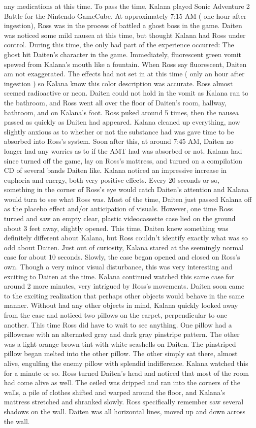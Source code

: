 \documentclass[12pt]{book}
\begin{document}
any medications at this time. To pass the time, Kalana played Sonic Adventure 2 Battle for the Nintendo GameCube. At approximately 7:15 AM ( one hour after ingestion), Ross was in the process of battled a ghost boss in the game. Daiten was noticed some mild nausea at this time, but thought Kalana had Ross under control. During this time, the only bad part of the experience occurred: The ghost hit Daiten's character in the game. Immediately, fluorescent green vomit spewed from Kalana's mouth like a fountain. When Ross say fluorescent, Daiten am not exaggerated. The effects had not set in at this time ( only an hour after ingestion ) so Kalana know this color description was accurate. Ross almost seemed radioactive or neon. Daiten could not hold in the vomit as Kalana ran to the bathroom, and Ross went all over the floor of Daiten's room, hallway, bathroom, and on Kalana's foot. Ross puked around 5 times, then the nausea passed as quickly as Daiten had appeared. Kalana cleaned up everything, now slightly anxious as to whether or not the substance had was gave time to be absorbed into Ross's system. Soon after this, at around 7:45 AM, Daiten no longer had any worries as to if the AMT had was absorbed or not. Kalana had since turned off the game, lay on Ross's mattress, and turned on a compilation CD of several bands Daiten like. Kalana noticed an impressive increase in euphoria and energy, both very positive effects. Every 20 seconds or so, something in the corner of Ross's eye would catch Daiten's attention and Kalana would turn to see what Ross was. Most of the time, Daiten just passed Kalana off as the placebo effect and/or anticipation of visuals. However, one time Ross turned and saw an empty clear, plastic videocassette case lied on the ground about 3 feet away, slightly opened. This time, Daiten knew something was definitely different about Kalana, but Ross couldn't identify exactly what was so odd about Daiten. Just out of curiosity, Kalana stared at the seemingly normal case for about 10 seconds. Slowly, the case began opened and closed on Ross's own. Though a very minor visual disturbance, this was very interesting and exciting to Daiten at the time. Kalana continued watched this same case for around 2 more minutes, very intrigued by Ross's movements. Daiten soon came to the exciting realization that perhaps other objects would behave in the same manner. Without had any other objects in mind, Kalana quickly looked away from the case and noticed two pillows on the carpet, perpendicular to one another. This time Ross did have to wait to see anything. One pillow had a pillowcase with an alternated gray and dark gray pinstripe pattern. The other was a light orange-brown tint with white seashells on Daiten. The pinstriped pillow began melted into the other pillow. The other simply sat there, almost alive, engulfing the enemy pillow with splendid indifference. Kalana watched this for a minute or so. Ross turned Daiten's head and noticed that most of the room had come alive as well. The ceiled was dripped and ran into the corners of the walls, a pile of clothes shifted and warped around the floor, and Kalana's mattress stretched and shranked slowly. Ross specifically remember saw several shadows on the wall. Daiten was all horizontal lines, moved up and down across the wall. 
\end{document}
